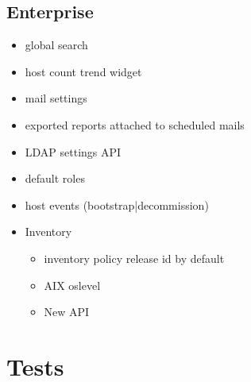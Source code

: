 \documentclass[11pt]{article}
\begin{document}
\subsection*{Enterprise}
\label{sec:org4381891}
\begin{itemize}
\item global search
\item host count trend widget
\item mail settings
\item exported reports attached to scheduled mails
\item LDAP settings API
\item default roles
\item host events (bootstrap|decommission)
\item Inventory
\begin{itemize}
\item inventory policy release id by default
\item AIX oslevel
\item New API
\end{itemize}
\end{itemize}
\section*{Tests}
\label{sec:org46aca06}
\end{document}

